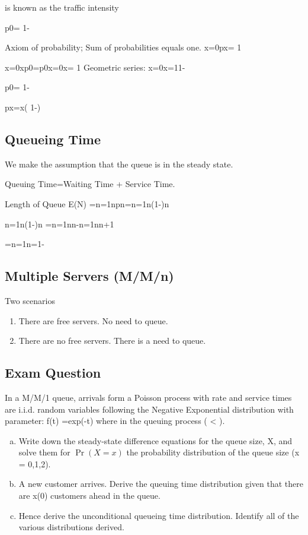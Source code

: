  is known as the traffic intensity

p0= 1-

		
Axiom of probability; Sum of probabilities equals one.
x=0px= 1  
	                       
		
x=0xp0=p0x=0x= 1
Geometric series: x=0x=11-

p0= 1-

px=x( 1-)

\subsection{Queueing Time }
We make the assumption that the queue is in the steady state.

	Queuing Time=Waiting Time + Service Time.

Length of Queue
E(N) =n=1npn=n=1n(1-)n

		n=1n(1-)n =n=1nn-n=1nn+1
		
	      
		 =n=1n=1-




\subsection{Multiple Servers (M/M/n)}
Two scenarios
\begin{enumerate}
\item There are free servers. No need to queue.
\item  There are no free servers. There is a need to queue.
\end{enumerate}

\subsection{Exam Question}
In a M/M/1 queue, arrivals form a Poisson process with rate  and service times are i.i.d. random variables following the Negative Exponential distribution with parameter: f(t) =exp(-t) where in the queuing process ( < ).


\begin{enumerate}[(a)]
\item Write down the steady-state difference equations for the queue size, X, and solve them for $\Pr(X=x)$ the probability distribution of the queue size (x = 0,1,2).

\item A new customer arrives. Derive the queuing time distribution given that there are x(0) customers ahead in the queue.

\item Hence derive the unconditional queueing time distribution. Identify all of the various distributions derived.
\end{enumerate}









